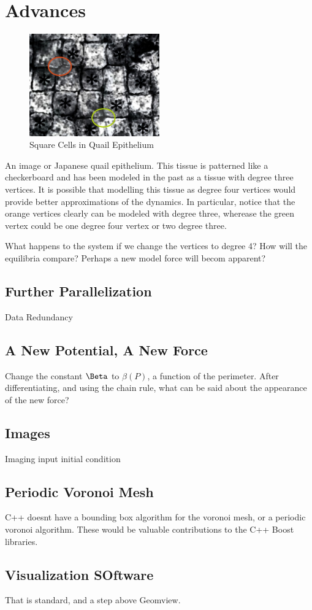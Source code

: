 \chapter{Advances}
\label{chap:advances}

\begin{figure}[hb]
\centering
\includegraphics[width=0.5\textwidth]{../diagrams/checkers.jpg}
\caption{Square Cells in Quail Epithelium}
\end{figure}

An image or Japanese quail epithelium. This tissue is patterned like a checkerboard and has been modeled in the past as a tissue with degree three vertices. It is possible that modelling this tissue as degree four vertices would provide better approximations of the dynamics.  In particular, notice that the orange vertices clearly can be modeled with degree three, wherease the green vertex could be one degree four vertex or two degree three.\cite{Checkers}


What happens to the system if we change the vertices to degree 4? How will the equilibria compare?
Perhaps a new model force will becom apparent?

\section{Further Parallelization}
Data Redundancy

\section{A New Potential, A New Force}
Change the constant $\Beta$ to $\beta(P)$, a function of the perimeter. After differentiating, and using the chain rule, what can be said about the appearance of the new force?

\section{Images}
Imaging input initial condition

\section{Periodic Voronoi Mesh}
C++ doesnt have a bounding box algorithm for the voronoi mesh, or a periodic voronoi algorithm. These would be valuable contributions to the C++ Boost libraries. 

\section{Visualization SOftware }

That is standard, and a step above Geomview. 


